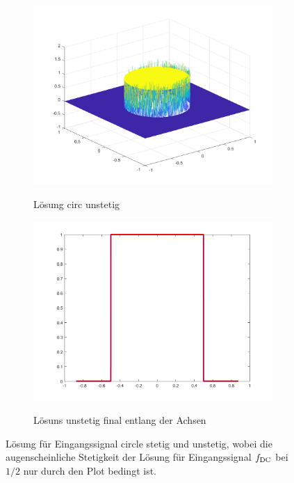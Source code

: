 \begin{figure}[p]
  \begin{subfigure}[b]{.48\linewidth}
    \centering
    \caption{Lösung circ unstetig}
    \includegraphics[trim = 40 30 30 30, clip, width=\linewidth]
      {pictures/chapExperiments/secGrayscale/circ/disc/adaptive/lvl26/solution.png}
    \label{fig:circDiscSol}
  \end{subfigure}
  \quad
  \begin{subfigure}[b]{.48\linewidth}
    \centering
    \caption{Lösuns unstetig final entlang der Achsen}
    \includegraphics[trim = 50 30 50 20, clip, width=\linewidth]
      {pictures/chapExperiments/secGrayscale/circ/disc/adaptive/lvl26/solutionAxis.png}
    \label{fig:circDiscSolAxis}
  \end{subfigure}
  \caption{Lösung für Eingangssignal circle stetig und unstetig, wobei die
  augenscheinliche Stetigkeit der Lösung für Eingangssignal $f_\textup{DC}$
  bei $1/2$ nur durch den Plot bedingt ist.}
  \label{fig:circleSol}
\end{figure}

